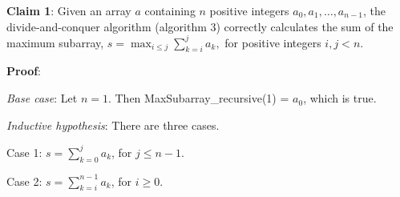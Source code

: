 \documentclass[a4paper,10pt]{article}
\begin{document}
% 
% 
% 
% 
% 


		{\bf Claim 1}: Given an array $a$ containing $n$ positive integers $a_0, a_1, \dots, a_{n-1}$, the divide-and-conquer algorithm (algorithm 3) correctly calculates the sum of the maximum subarray, $\displaystyle s = \max_{i\leq{j}} \sum_{k=i}^j a_k,$ for positive integers $i,j<n$.

		{\bf Proof}:

		{\it Base case}: Let $n=1$. Then {\ttfamily MaxSubarray\_recursive(1)} = $a_0$, which is true.

		{\it Inductive hypothesis}: There are three cases.

		{\sc Case 1}: $\displaystyle s = \sum_{k=0}^j a_k$, for $j \leq n-1$.

		{\sc Case 2}: $\displaystyle s = \sum_{k=i}^{n-1} a_k$, for $i \geq 0$.
\end{document}
